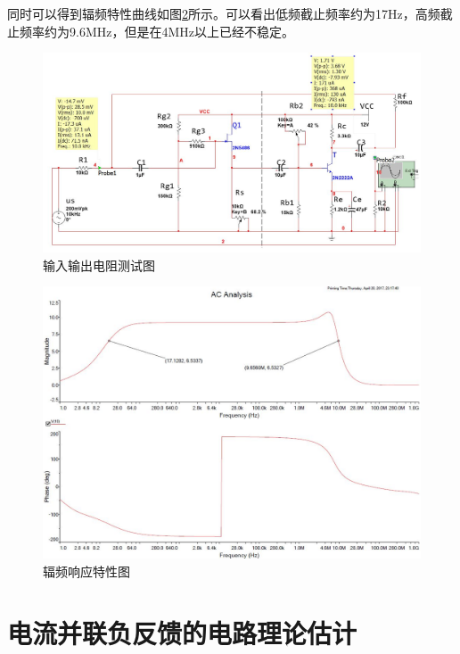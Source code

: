 \documentclass[UTF8,a4paper]{ctexart}
\begin{document}
同时可以得到辐频特性曲线如图\ref{F}所示。可以看出低频截止频率约为17Hz，高频截止频率约为9.6MHz，但是在4MHz以上已经不稳定。

\begin{figure}
\centering
\includegraphics[width=\textwidth]{R.jpg}
\caption{输入输出电阻测试图}
\label{R}
\end{figure}

\begin{figure}
\centering
\includegraphics[width=\textwidth]{F.jpg}
\caption{辐频响应特性图}
\label{F}
\end{figure}
\section{电流并联负反馈的电路理论估计}
\end{document}
